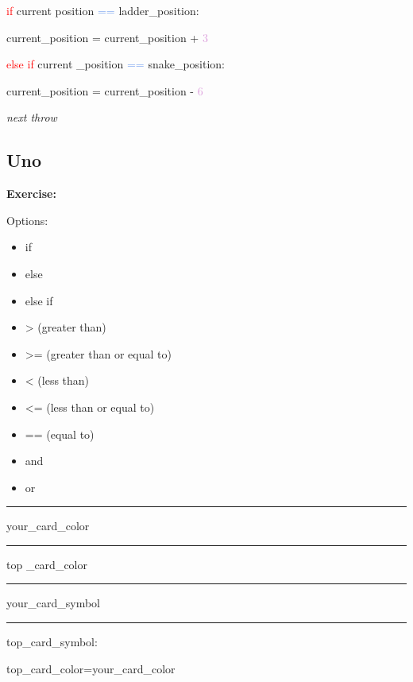 \textcolor{red}{if} current position \textcolor{CornflowerBlue}{==} ladder\_position: 

\hspace{1cm} 
current\_position = current\_position + \textcolor{Plum}{3}

\hspace{0.1cm}

\textcolor{red}{else if} current \_position \textcolor{CornflowerBlue}{==} snake\_position: 

\hspace{1cm} current\_position = current\_position - \textcolor{Plum}{6}

\textit{next throw}


\subsection*{Uno}

\textbf{Exercise:}

Options:

\begin{itemize}
\color{red}
\item if
\item else 
\item else if
\end{itemize}

\begin{itemize}
\color{CornflowerBlue}
\item > (greater than)
\item >= (greater than or equal to)
\item < (less than)
\item <= (less than or equal to)
\item == (equal to)
\end{itemize}

\begin{itemize}
\color{LimeGreen}
\item and   
\item or
\end{itemize}



\textcolor{red}{\rule[-0.5ex]{0.7cm}{1pt}} your\_card\_color \textcolor{CornflowerBlue}{\rule[-0.5ex]{0.7cm}{1pt}} top \_card\_color \textcolor{LimeGreen}{\rule[-0.5ex]{0.7cm}{1pt}}
your\_card\_symbol \textcolor{CornflowerBlue}{\rule[-0.5ex]{0.7cm}{1pt}}
top\_card\_symbol:

\hspace{1cm}
top\_card\_color=your\_card\_color


